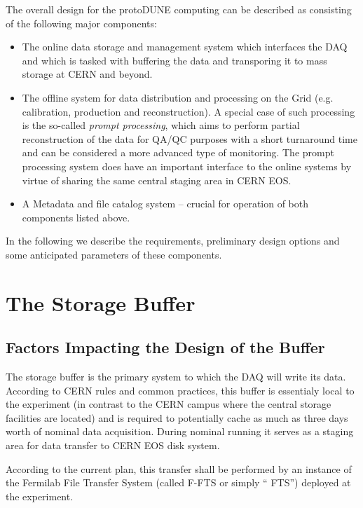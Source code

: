 \documentclass[pdftex,12pt,letter]{article}
\begin{document}
The overall design for the protoDUNE computing can be described as consisting of the following major components:
\begin{itemize}

\item The online data storage and management system which interfaces the DAQ and which is tasked with buffering
the data and transporing it to mass storage at CERN and beyond.

\item The offline system for data distribution and processing on the Grid (e.g. calibration, production and reconstruction). A special case
of such processing is the so-called \textit{prompt processing}, which aims to perform partial reconstruction of the data for QA/QC purposes
with a short turnaround time and can be considered a more advanced type of monitoring. The prompt processing system
does have an important interface to the online systems by virtue of sharing the same central staging area in CERN EOS.

\item A Metadata and file catalog system -- crucial for operation of both components listed above.

\end{itemize}

\noindent In the following we describe the requirements, preliminary design options and some anticipated parameters
of these components.

\section{The Storage Buffer}
\subsection{Factors Impacting the Design of the Buffer}
The storage buffer is the primary system to which the DAQ will write its data.
According to CERN rules and common practices, this buffer is essentialy local to the experiment
(in contrast to the CERN campus where the central storage facilities are located) and is
required to potentially cache as much as
three days worth of nominal data acquisition.
During nominal running it serves as a staging area for data transfer
to CERN EOS disk system.

According to the current plan, this transfer shall be performed by
an instance of the Fermilab File Transfer System (called F-FTS or simply `` FTS'') deployed
at the experiment.
\end{document}
